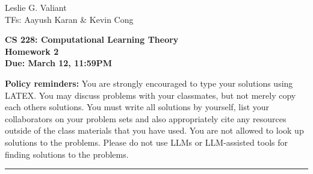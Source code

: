 \documentclass[11pt]{article}
\DeclareMathOperator{\1}{\mathbbm{1}}
\begin{document}
\begin{flushright}
			Leslie G. Valiant \\
			TFs: Aayush Karan \& Kevin Cong
\end{flushright}

\begin{center}
\textbf{CS 228: Computational Learning Theory} \\
\textbf{Homework 2}\\ \textbf{Due: March 12, 11:59PM}
\end{center}

\textbf{Policy reminders:} You are strongly encouraged to type your solutions using LATEX. You may
discuss problems with your classmates, but not merely copy each others solutions. You must write
all solutions by yourself, list your collaborators on your problem sets and also appropriately cite
any resources outside of the class materials that you have used. You are not allowed to look up
solutions to the problems. Please do not use LLMs or LLM-assisted tools for finding solutions to the
problems. 
\rule{\linewidth}{0.4pt}
\end{document}
